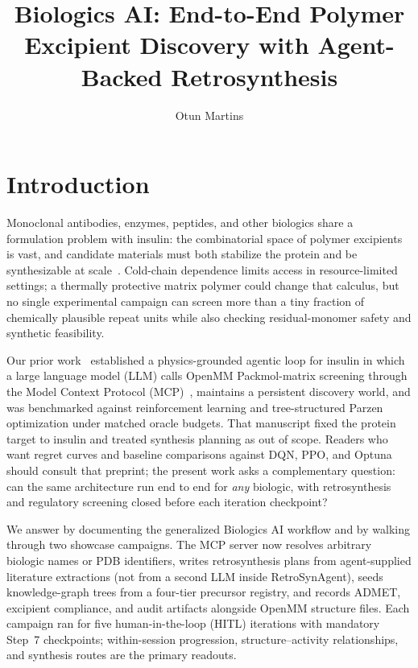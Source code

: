 \documentclass[twocolumn]{fairmeta}
\title{Biologics AI: End-to-End Polymer Excipient Discovery with Agent-Backed Retrosynthesis}
\author[1]{Otun Martins}
\affiliation[1]{Algonix Ltd., United Kingdom}
\begin{document}
\maketitle

\section{Introduction}

Monoclonal antibodies, enzymes, peptides, and other biologics share a formulation problem with insulin: the combinatorial space of polymer excipients is vast, and candidate materials must both stabilize the protein and be synthesizable at scale~\cite{hsu2022glycosylated}.
Cold-chain dependence limits access in resource-limited settings; a thermally protective matrix polymer could change that calculus, but no single experimental campaign can screen more than a tiny fraction of chemically plausible repeat units while also checking residual-monomer safety and synthetic feasibility.

Our prior work~\cite{martins2026insulin} established a physics-grounded agentic loop for insulin in which a large language model (LLM) calls OpenMM Packmol-matrix screening through the Model Context Protocol (MCP)~\cite{mcp2024}, maintains a persistent discovery world, and was benchmarked against reinforcement learning and tree-structured Parzen optimization under matched oracle budgets.
That manuscript fixed the protein target to insulin and treated synthesis planning as out of scope.
Readers who want regret curves and baseline comparisons against DQN, PPO, and Optuna should consult that preprint; the present work asks a complementary question: can the same architecture run end to end for \emph{any} biologic, with retrosynthesis and regulatory screening closed before each iteration checkpoint?

We answer by documenting the generalized Biologics AI workflow and by walking through two showcase campaigns.
The MCP server now resolves arbitrary biologic names or PDB identifiers, writes retrosynthesis plans from agent-supplied literature extractions (not from a second LLM inside RetroSynAgent), seeds knowledge-graph trees from a four-tier precursor registry, and records ADMET, excipient compliance, and audit artifacts alongside OpenMM structure files.
Each campaign ran for five human-in-the-loop (HITL) iterations with mandatory Step~7 checkpoints; within-session progression, structure--activity relationships, and synthesis routes are the primary readouts.
\end{document}
